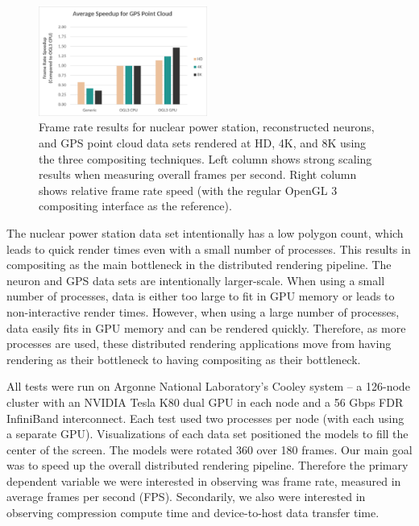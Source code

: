 \documentclass{vgtc}                          %
\begin{document}
\begin{figure}[!b]
  \includegraphics[width=0.494\textwidth,page=1]{Speedup_GPSPointCloud.pdf}
  \caption{Frame rate results for nuclear power station, reconstructed neurons, and GPS point cloud data sets rendered at HD, 4K, and 8K using the three compositing techniques. Left column shows strong scaling results when measuring overall frames per second. Right column shows relative frame rate speed (with the regular OpenGL 3 compositing interface as the reference).}
  \label{fig:results_fps}
\end{figure}

The nuclear power station data set intentionally has a low polygon count, which leads to quick render times even with a small number of processes. This results in compositing as the main bottleneck in the distributed rendering pipeline. The neuron and GPS data sets are intentionally larger-scale. When using a small number of processes, data is either too large to fit in GPU memory or leads to non-interactive render times. However, when using a large number of processes, data easily fits in GPU memory and can be rendered quickly. Therefore, as more processes are used, these distributed rendering applications move from having rendering as their bottleneck to having compositing as their bottleneck.

All tests were run on Argonne National Laboratory's Cooley system -- a 126-node cluster with an NVIDIA Tesla K80 dual GPU in each node and a 56 Gbps FDR InfiniBand interconnect. Each test used two processes per node (with each using a separate GPU). Visualizations of each data set positioned the models to fill the center of the screen. The models were rotated 360\textdegree{} over 180 frames. Our main goal was to speed up the overall distributed rendering pipeline. Therefore the primary dependent variable we were interested in observing was frame rate, measured in average frames per second (FPS). Secondarily, we also were interested in observing compression compute time and device-to-host data transfer time.
\end{document}
